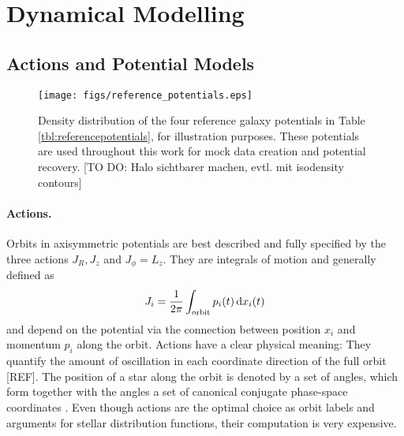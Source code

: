 \section{Dynamical Modelling}

\subsection{Actions and Potential Models}  \label{sec:potentials}



\begin{figure*}
\texttt{[image: figs/reference\_potentials.eps]}
\caption{Density distribution of the four reference galaxy potentials in Table \ref{tbl:referencepotentials}, for illustration purposes. These potentials are used throughout this work for mock data creation and potential recovery. [TO DO: Halo sichtbarer machen, evtl. mit isodensity contours]}
\label{fig:ref_pots}
\end{figure*}


\paragraph{Actions.} Orbits in axisymmetric potentials are best described and fully specified by the three actions $J_R, J_z$ and $J_\phi=L_z$. They are integrals of motion and generally defined as
\begin{equation}
J_i = \frac{1}{2\pi} \int_\text{orbit} p_i(t) \mathop{}\!\mathrm{d} x_i(t) \label{eq:action_general}
\end{equation}
and depend on the potential via the connection between position $x_i$ and momentum $p_i$ along the orbit. Actions have a clear physical meaning: They quantify the amount of oscillation in each coordinate direction of the full orbit [REF]. The position of a star along the orbit is denoted by a set of angles, which form together with the angles a set of canonical conjugate phase-space coordinates \citep{bin08}. Even though actions are the optimal choice as orbit labels and arguments for stellar distribution functions, their computation is very expensive.

